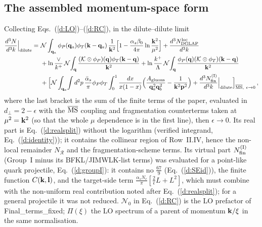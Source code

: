 \subsection{The assembled momentum-space form}\label{sec:d-assembled}
Collecting Eqs.~(\ref{d:LO})--(\ref{d:RC}), in the dilute--dilute limit
\begin{align}
\frac{d^3N}{d^3k}\Big|_{\rm dilute}=\ &\mathcal N\int_{\mathbf{q}_a}\phi_P(\mathbf{q}_a)\phi_T(\mathbf{k}-\mathbf{q}_a)\,\frac{1}{\mathbf{k}^2}\Big[1-\frac{\alpha_s\beta_0}{4\pi}\ln\frac{\mathbf{k}^2}{\mu^2}\Big]+\frac{d^3N^{\rm loc}_{\rm DGLAP}}{d^3k}\notag\\
&+\ln\frac{\vee}{k^+}\,\mathcal N\!\int_{\mathbf{q}}\frac{(\mathcal K\otimes\phi_P)(\mathbf{q})\phi_T(\mathbf{k}-\mathbf{q})}{\mathbf{k}^2}+\ln\frac{k^+}{\Lambda}\,\mathcal N\!\int_{\mathbf{q}}\frac{\phi_P(\mathbf{q})(\mathcal K\otimes\phi_T)(\mathbf{k}-\mathbf{q})}{\mathbf{k}^2}\notag\\
&+\Big[\mathcal N\int_{\mathbf{q}_a}\!\int d^2p\,\frac{\bar\alpha_s}{\pi}\phi_P\phi_T\int_0^1\frac{dx}{x(1-x)}\Big(\frac{A_{\rm gluons}}{\mathbf{q}_a^2\mathbf{q}_b^2}-\frac{1}{\mathbf{k}^2\mathbf{p}^2}\Big)+\frac{d^3N^{\rm(I)}_{\rm fin}}{d^3k}\Big|_{\rm dilute}\Big]_{\overline{\rm MS},\ \epsilon\to0}\,,\label{d:all}
\end{align}
where the last bracket is the sum of the finite terms of the paper, evaluated in $d_\perp=2-\epsilon$ with the $\overline{\rm MS}$ coupling and fragmentation counterterms taken at $\mu^2=\mathbf{k}^2$ (so that the whole $\mu$ dependence is in the first line), then $\epsilon\to0$. Its real part is Eq.~(\ref{d:realsplit}) without the logarithm (verified integrand, Eq.~(\ref{d:identity})); it contains the collinear region of Row~II.IV, hence the non-local remainder $N_{\mathcal R}$ and the fragmentation-scheme terms. Its virtual part $N^{\rm(I)}_{\rm fin}$ (Group~I minus its BFKL/JIMWLK-list terms) was evaluated for a point-like quark projectile, Eq.~(\ref{d:groupI}): it contains no $\frac{67}{9}$ (Eq.~(\ref{d:SEid})), the finite function $C(\mathbf{k},\mathbf{l})$, and the target-side term $\frac{\alpha_sN_c}{\pi}[\frac2\epsilon L+L^2]$, which must combine with the non-uniform real contribution noted after Eq.~(\ref{d:realsplit}); for a general projectile it was not reduced. $\mathcal N_0$ in Eq.~(\ref{d:RC}) is the LO prefactor of Final\_terms\_fixed; $\Pi(\xi)$ the LO spectrum of a parent of momentum $\mathbf{k}/\xi$ in the same normalisation.

